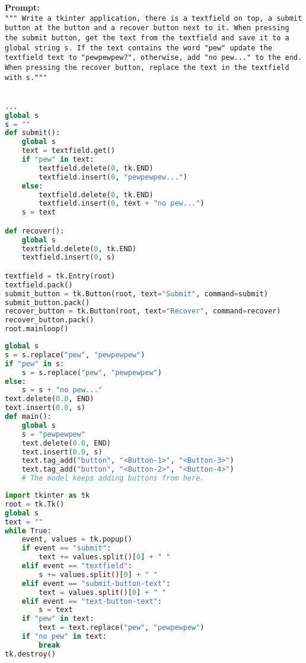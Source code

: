 \begin{AIbox}{}
\textbf{Prompt:}\\ \tt{\footnotesize """ Write a tkinter application, there is a textfield on top, a submit button at the button and a recover button next to it. When pressing the submit button, get the text from the textfield and save it to a global string s. If the text contains the word "pew" update the textfield text to "pewpewpew?", otherwise, add "no pew..." to the end. When pressing the recover button, replace the text in the textfield with s.\newline """}
\\
\\
\begin{minipage}[t]{0.475\linewidth}
\textbf{\phione}
\begin{lstlisting}[language=Python, style=mystyle]
...
global s
s = ""
def submit():
    global s
    text = textfield.get()
    if "pew" in text:
        textfield.delete(0, tk.END)
        textfield.insert(0, "pewpewpew...")
    else:
        textfield.delete(0, tk.END)
        textfield.insert(0, text + "no pew...")
    s = text

def recover():
    global s
    textfield.delete(0, tk.END)
    textfield.insert(0, s)

textfield = tk.Entry(root)
textfield.pack()
submit_button = tk.Button(root, text="Submit", command=submit)
submit_button.pack()
recover_button = tk.Button(root, text="Recover", command=recover)
recover_button.pack()
root.mainloop()
\end{lstlisting}
\end{minipage}
\begin{minipage}[t]{0.525\linewidth}
\textbf{\phionebase}
\begin{lstlisting}[language=Python, style=mystyle]
global s
s = s.replace("pew", "pewpewpew")
if "pew" in s:
    s = s.replace("pew", "pewpewpew")
else:
    s = s + "no pew..."
text.delete(0.0, END)
text.insert(0.0, s)
def main():
    global s
    s = "pewpewpew"
    text.delete(0.0, END)
    text.insert(0.0, s)
    text.tag_add("button", "<Button-1>", "<Button-3>")
    text.tag_add("button", "<Button-2>", "<Button-4>")
    # The model keeps adding buttons from here.
\end{lstlisting}
\textbf{\phionesmall}
\begin{lstlisting}[language=Python, style=mystyle]
import tkinter as tk 
root = tk.Tk()
global s
text = ""
while True:
    event, values = tk.popup()
    if event == "submit":
        text += values.split()[0] + " "
    elif event == "textfield":
        s += values.split()[0] + " "
    elif event == "submit-button-text":
        text = values.split()[0] + " "
    elif event == "text-button-text":
        s = text
    if "pew" in text:
        text = text.replace("pew", "pewpewpew")
    if "no pew" in text:
        break
tk.destroy()
\end{lstlisting}
\end{minipage}
\end{AIbox}

